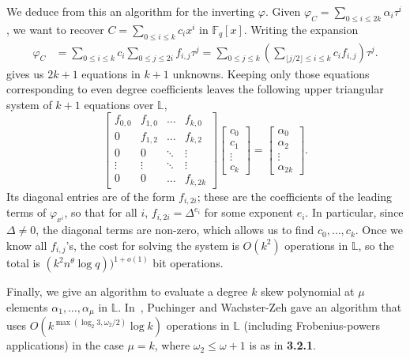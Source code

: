 \documentclass[sigconf]{acmart}
\newcommand{\F}{\mathbb{F}}
\renewcommand{\L}{\mathbb{L}}
\begin{document}
\smallskip{}  We deduce from this an algorithm for the
inverting $\varphi$.  Given
$\varphi_C = \sum_{0 \le i \le 2k} \alpha_i \tau^i$, we want to
recover $C =\sum_{0 \le i \le k} c_ix^i $ in $\F_q[x]$. Writing the
expansion
\begin{align*}\label{eq:phic}
\varphi_C &= \sum_{0 \le i \le k} c_i \sum_{0 \le j \le 2i} f_{i,j} \tau^j = \sum_{0 \le j \le k}  \left (\sum_{\lfloor j/2\rfloor \le i \le k} c_i f_{i,j} \right) \tau^j.
\end{align*}
gives us $2k+1$ equations in $k+1$
unknowns. Keeping only those equations corresponding to even degree
coefficients leaves the following upper triangular system of $k + 1$
equations over $\L$,
\begin{equation}
\begin{bmatrix} f_{0,0} & f_{1,0} & \ldots & f_{k, 0} \\
                 0      & f_{1,2} & \ldots & f_{k, 2}  \\
                 0      & 0       & \ddots & \vdots                      \\
                 \vdots  & \vdots  &  \ddots      & \vdots                       \\
                 0  & 0 & \ldots & f_{k, 2k}
\end{bmatrix}
\begin{bmatrix}
  c_0 \\ c_1 \\ \vdots \\ c_k
\end{bmatrix} = \begin{bmatrix} \alpha_{0} \\ \alpha_{2} \\ \vdots \\ \alpha_{2k} \end{bmatrix}.
\end{equation}
Its diagonal entries are of the form $f_{i,2i}$; these are the
coefficients of the leading terms of $\varphi_{x^i}$, so that for all
$i$, $f_{i,2i} = \Delta^{e_i}$ for some exponent $e_i$. In particular,
since $\Delta \neq 0$, the diagonal terms are non-zero, which allows
us to find $c_0,\dots,c_{k}$. Once we know all $f_{i,j}$'s, the cost
for solving the system is $O(k^2)$ operations in $\L$, so the total is
$ (k^2 n^{\theta} \log q))^{1+o(1)}$ bit operations.

\smallskip{}  Finally, we give an algorithm to
evaluate a degree $k$ skew polynomial at $\mu$ elements
$\alpha_1,\dots,\alpha_\mu$ in $\L$. In~\cite[Th.~15]{PUCHINGER2017b},
Puchinger and Wachster-Zeh gave an algorithm that uses
$O(k^{\max(\log_2 3, \omega_2/2)}\log k)$ operations in $\L$
(including Frobenius-powers applications) in the case $\mu=k$,
where $\omega_2 \le \omega+1$ is as in {\bf 3.2.1}.
\end{document}
